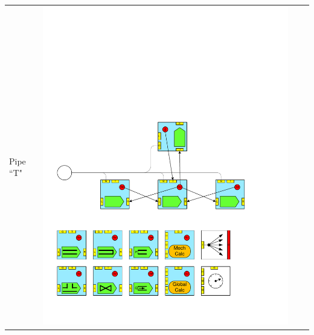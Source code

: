 \begin{table}
\begin{center}
\begin{tabular}{|p{2cm}|c|p{2cm}|c|}
Pipe ``T" 		&\includegraphics[page=15, scale=0.25]{./figs/1dcfd/ElementalProcessors.pdf} &

\end{tabular}
\end{center}
\end{table}
